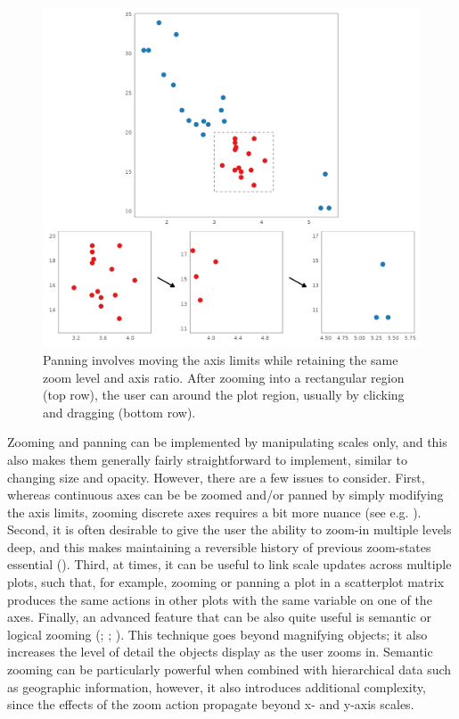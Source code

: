 \documentclass[
]{book}
\begin{document}
\begin{figure}

{\centering \includegraphics[width=20.83in]{./figures/panning} 

}

\caption{Panning involves moving the axis limits while retaining the same zoom level and axis ratio. After zooming into a rectangular region (top row), the user can around the plot region, usually by clicking and dragging (bottom row).}\label{fig:panning}
\end{figure}

Zooming and panning can be implemented by manipulating scales only, and this also makes them generally fairly straightforward to implement, similar to changing size and opacity. However, there are a few issues to consider. First, whereas continuous axes can be be zoomed and/or panned by simply modifying the axis limits, zooming discrete axes requires a bit more nuance (see e.g. ). Second, it is often desirable to give the user the ability to zoom-in multiple levels deep, and this makes maintaining a reversible history of previous zoom-states essential (). Third, at times, it can be useful to link scale updates across multiple plots, such that, for example, zooming or panning a plot in a scatterplot matrix produces the same actions in other plots with the same variable on one of the axes. Finally, an advanced feature that can be also quite useful is semantic or logical zooming (; ; ). This technique goes beyond magnifying objects; it also increases the level of detail the objects display as the user zooms in. Semantic zooming can be particularly powerful when combined with hierarchical data such as geographic information, however, it also introduces additional complexity, since the effects of the zoom action propagate beyond x- and y-axis scales.
\end{document}
